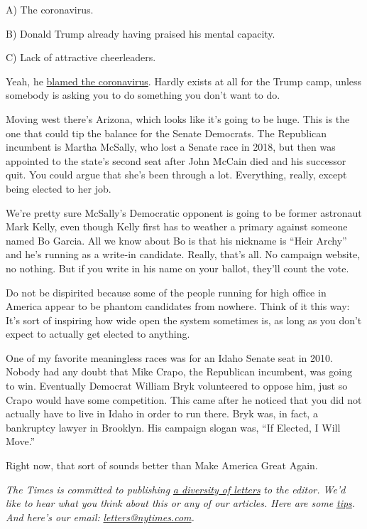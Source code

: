 A) The coronavirus.

B) Donald Trump already having praised his mental capacity.

C) Lack of attractive cheerleaders.

Yeah, he
\href{https://whnt.com/news/tommy-tuberville-says-he-wont-debate-jeff-sessions/}{blamed
the coronavirus}. Hardly exists at all for the Trump camp, unless
somebody is asking you to do something you don't want to do.

Moving west there's Arizona, which looks like it's going to be huge.
This is the one that could tip the balance for the Senate Democrats. The
Republican incumbent is Martha McSally, who lost a Senate race in 2018,
but then was appointed to the state's second seat after John McCain died
and his successor quit. You could argue that she's been through a lot.
Everything, really, except being elected to her job.

We're pretty sure McSally's Democratic opponent is going to be former
astronaut Mark Kelly, even though Kelly first has to weather a primary
against someone named Bo Garcia. All we know about Bo is that his
nickname is ``Heir Archy'' and he's running as a write-in candidate.
Really, that's all. No campaign website, no nothing. But if you write in
his name on your ballot, they'll count the vote.

Do not be dispirited because some of the people running for high office
in America appear to be phantom candidates from nowhere. Think of it
this way: It's sort of inspiring how wide open the system sometimes is,
as long as you don't expect to actually get elected to anything.

One of my favorite meaningless races was for an Idaho Senate seat in
2010. Nobody had any doubt that Mike Crapo, the Republican incumbent,
was going to win. Eventually Democrat William Bryk volunteered to oppose
him, just so Crapo would have some competition. This came after he
noticed that you did not actually have to live in Idaho in order to run
there. Bryk was, in fact, a bankruptcy lawyer in Brooklyn. His campaign
slogan was, ``If Elected, I Will Move.''

Right now, that sort of sounds better than Make America Great Again.

\emph{The Times is committed to publishing}
\href{https://www.nytimes.com/2019/01/31/opinion/letters/letters-to-editor-new-york-times-women.html}{\emph{a
diversity of letters}} \emph{to the editor. We'd like to hear what you
think about this or any of our articles. Here are some}
\href{https://help.nytimes.com/hc/en-us/articles/115014925288-How-to-submit-a-letter-to-the-editor}{\emph{tips}}\emph{.
And here's our email:}
\href{mailto:letters@nytimes.com}{\emph{letters@nytimes.com}}\emph{.}

